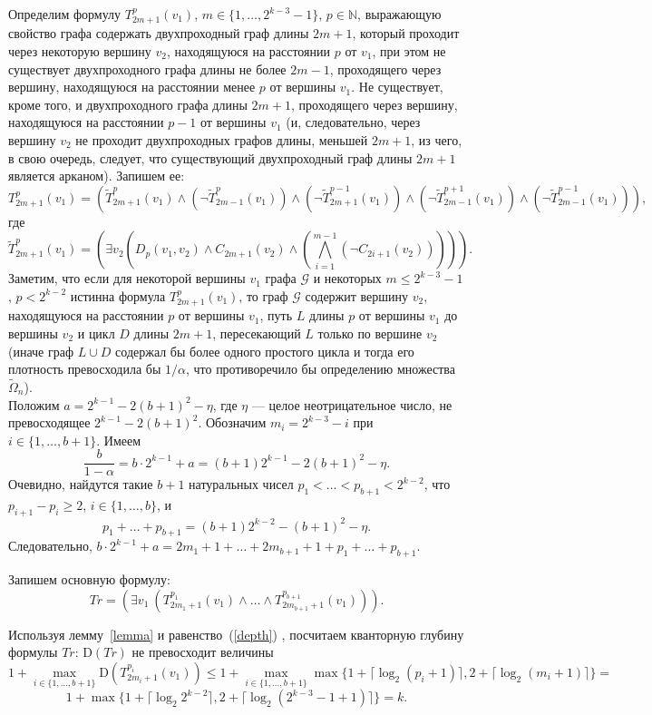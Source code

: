 \documentclass[12pt,a4paper,russian,titlepage]{article}
\begin{document}
Определим формулу $T_{2m+1}^{p}(v_1)$, $m\in\{1,\ldots,2^{k-3}-1\}$, $p\in\mathbb{N}$, выражающую свойство графа содержать двухпроходный граф длины $2m+1$, который проходит через некоторую вершину $v_2$, находящуюся на расстоянии $p$ от $v_1$, при этом не существует двухпроходного графа длины не более $2m-1$, проходящего через вершину, находящуюся на расстоянии менее $p$ от вершины $v_1$. Не существует, кроме того, и двухпроходного графа длины $2m+1$, проходящего через вершину, находящуюся на расстоянии $p-1$ от вершины $v_1$ (и, следовательно, через вершину $v_2$ не проходит двухпроходных графов длины, меньшей $2m+1$, из чего, в свою очередь, следует, что существующий двухпроходный граф длины $2m+1$ является арканом). Запишем ее:
$$
 T_{2m+1}^{p} (v_1) =
 \left(\tilde T_{2m+1}^{p}(v_1) \wedge (\neg\tilde T_{2m-1}^{p}(v_1))\wedge(\neg\tilde T_{2m+1}^{p-1}(v_1))\wedge(\neg\tilde T_{2m-1}^{p+1}(v_1))\wedge(\neg\tilde T_{2m-1}^{p-1}(v_1))\right),
$$
где
$$
 \tilde T_{2m+1}^{p}(v_1) = \left(\exists v_2 \left( D_{p}(v_1,v_2) \wedge C_{2m+1}(v_2)\wedge\left(\bigwedge_{i=1}^{m-1}(\neg C_{2i+1}(v_2))\right)\right)\right).
$$
Заметим, что если для некоторой вершины $v_1$ графа $\mathcal{G}$ и некоторых $m\leq 2^{k-3}-1$, $p< 2^{k-2}$ истинна формула $T_{2m+1}^{p}(v_1)$, то граф $\mathcal{G}$ содержит вершину $v_2$, находящуюся на расстоянии $p$ от вершины $v_1$, путь $L$ длины $p$ от вершины $v_1$ до вершины $v_2$ и цикл $D$ длины $2m+1$, пересекающий $L$ только по вершине $v_2$ (иначе граф $L\cup D$ содержал бы более одного простого цикла и тогда его плотность превосходила бы $1/\alpha$, что противоречило бы определению множества $\tilde\Omega_n$).\\




Положим $a=2^{k-1}-2(b+1)^2-\eta$, где $\eta$ --- целое неотрицательное число, не превосходящее $2^{k-1}-2(b+1)^2$. Обозначим $m_i=2^{k-3}-i$ при $i\in\{1,\ldots,b+1\}$. Имеем
$$
 \frac{b}{1-\alpha}=b\cdot 2^{k-1}+a=(b+1)2^{k-1}-2(b+1)^2-\eta.
$$ 
Очевидно, найдутся такие $b+1$ натуральных чисел $p_1<\ldots<p_{b+1}<2^{k-2}$, что $p_{i+1}-p_i\geq 2$, $i\in\{1,\ldots,b\}$, и
$$
 p_1+\ldots+p_{b+1}=(b+1)2^{k-2}-(b+1)^2-\eta.
$$
Следовательно, $b\cdot 2^{k-1}+a=2m_1+1+\ldots+2m_{b+1}+1+p_1+\ldots+p_{b+1}$.

Запишем основную формулу:
$$
 Tr = \left( \exists v_1\ \left(T_{2m_1+1}^{p_1}(v_1)\wedge \ldots \wedge T_{2m_{b+1}+1}^{p_{b+1}}(v_1)\right)\right ).
$$

Используя лемму~\ref{lemma} и равенство~(\ref{depth}) , посчитаем кванторную глубину формулы $Tr$: $\mathrm{D}(Tr)$ не превосходит величины
$$
 1 +\max_{i\in\{1,\ldots,b+1\}}\mathrm{D}\left(T_{2m_i+1}^{p_i}(v_1)\right)\leq
 1+\max_{i\in\{1,\ldots,b+1\}}\max\{1+\lceil\log_2(p_i+1)\rceil,2+\lceil\log_2(m_i+1)\rceil \}=
$$ 
$$ 
 1+\max\{1+\lceil\log_2 2^{k-2}\rceil,2+\lceil\log_2(2^{k-3}-1+1)\rceil \}=k.
$$
\end{document}

